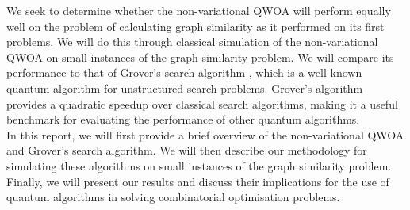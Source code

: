We seek to determine whether the non-variational QWOA will perform equally well on the problem of calculating graph similarity as it performed on its first problems. We will do this through classical simulation of the non-variational QWOA on small instances of the graph similarity problem. We will compare its performance to that of Grover's search algorithm \cite{grover_search}, which is a well-known quantum algorithm for unstructured search problems. Grover's algorithm provides a quadratic speedup over classical search algorithms, making it a useful benchmark for evaluating the performance of other quantum algorithms.
\\
In this report, we will first provide a brief overview of the non-variational QWOA and Grover's search algorithm. We will then describe our methodology for simulating these algorithms on small instances of the graph similarity problem. Finally, we will present our results and discuss their implications for the use of quantum algorithms in solving combinatorial optimisation problems.
